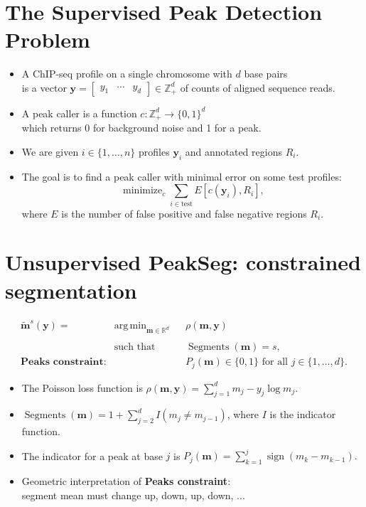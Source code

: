 \documentclass[legalpaper]{article}
\newcommand{\ZZ}{\mathbb Z}
\newcommand{\RR}{\mathbb R}
\DeclareMathOperator*{\minimize}{minimize}
\DeclareMathOperator*{\sign}{sign}
\DeclareMathOperator*{\argmin}{arg\,min}
\DeclareMathOperator*{\Segments}{Segments}
\begin{document}
\section*{The Supervised Peak Detection Problem}

\begin{itemize}
\item A ChIP-seq profile on a single
chromosome with $d$ base pairs\\ is a vector $\mathbf y=
\left[
  \begin{array}{ccc}
    y_1 & \cdots & y_d
  \end{array}
\right]\in\ZZ_+^d$ of counts of aligned sequence reads. 
\item A peak caller is a function $c:\ZZ_+^d
  \rightarrow \{0, 1\}^d$\\
  which returns 0 for background noise and 1 for a peak.
\item We are given $i\in\{1,\dots, n\}$ profiles 
  $\mathbf y_i$ and annotated regions $R_i$.
\item The goal is to find a peak caller with minimal error on some
test profiles:
\begin{equation*}
  \label{eq:min_error}
  \minimize_c \sum_{i\in\text{test}} E[c(\mathbf y_i),  R_i],
\end{equation*}
where $E$ is the number of false positive and false negative regions $R_i$.
\end{itemize}

\newpage 

\section*{Unsupervised PeakSeg: 
constrained segmentation}

\begin{equation*}
  \label{argmin:constrained}
  \begin{aligned}
    \mathbf{\tilde m}^s(\mathbf y)  =\ 
    &\argmin_{\mathbf m\in\RR^{d}} && 
    \rho
    (\mathbf m, \mathbf y) \\
    \\
    &\text{such that} && \Segments(\mathbf m)=s,\\
    \textbf{Peaks constraint:}
    & && P_j(\mathbf m) \in\{0, 1\} \text{ for all } j\in\{1, \dots, d\}.
  \end{aligned}
\end{equation*}
\begin{itemize}
\item The Poisson loss function is $\rho(\mathbf m, \mathbf y)=
  \sum_{j=1}^d m_j - y_j \log m_j$.
\item$\Segments(\mathbf m)=1+\sum_{j=2}^d I(m_j \neq m_{j-1})$, where
  $I$ is the indicator function.
\item The indicator for a peak at base $j$ is 
$
  P_j(\mathbf m) = \sum_{k=1}^j \sign( m_k - m_{k-1} ).
$
\item Geometric interpretation of \textbf{Peaks constraint}:\\
  segment mean must change up, down, up, down, ...
\end{itemize}
\end{document}
